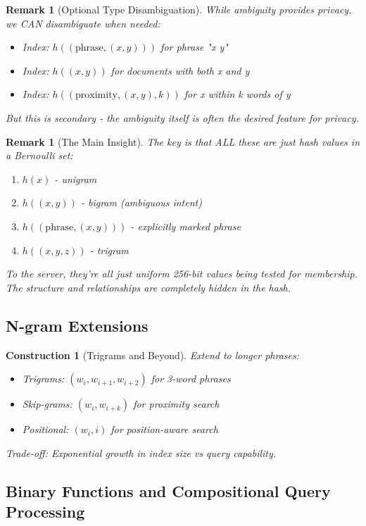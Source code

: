 \documentclass[11pt,final,hidelinks]{article}
\newtheorem{remark}[theorem]{Remark}
\newtheorem{construction}[theorem]{Construction}
\begin{document}
\begin{remark}[Optional Type Disambiguation]
While ambiguity provides privacy, we CAN disambiguate when needed:
\begin{itemize}
    \item Index: $h((\text{phrase}, (x, y)))$ for phrase "x y"
    \item Index: $h((x, y))$ for documents with both x and y
    \item Index: $h((\text{proximity}, (x, y), k))$ for x within k words of y
\end{itemize}
But this is secondary - the ambiguity itself is often the desired feature for privacy.
\end{remark}

\begin{remark}[The Main Insight]
The key is that ALL these are just hash values in a Bernoulli set:
\begin{enumerate}
    \item $h(x)$ - unigram
    \item $h((x,y))$ - bigram (ambiguous intent)
    \item $h((\text{phrase}, (x,y)))$ - explicitly marked phrase
    \item $h((x,y,z))$ - trigram
\end{enumerate}
To the server, they're all just uniform 256-bit values being tested for membership. The structure and relationships are completely hidden in the hash.
\end{remark}

\subsection{N-gram Extensions}

\begin{construction}[Trigrams and Beyond]
Extend to longer phrases:
\begin{itemize}
    \item Trigrams: $(w_i, w_{i+1}, w_{i+2})$ for 3-word phrases
    \item Skip-grams: $(w_i, w_{i+k})$ for proximity search
    \item Positional: $(w_i, i)$ for position-aware search
\end{itemize}
Trade-off: Exponential growth in index size vs query capability.
\end{construction}

\subsection{Binary Functions and Compositional Query Processing}
\end{document}
